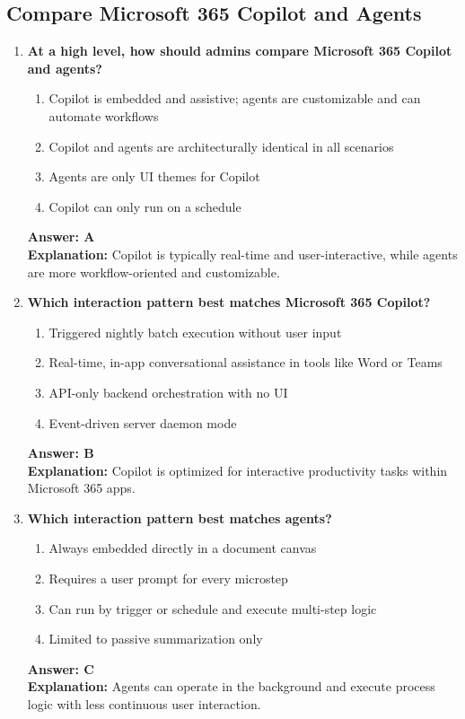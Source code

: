 \documentclass[10pt]{article}
\begin{document}
\subsection{Compare Microsoft 365 Copilot and Agents}
\begin{enumerate}[leftmargin=*]

\item \textbf{At a high level, how should admins compare Microsoft 365 Copilot and agents?}
\begin{enumerate}[label=\Alph*.]
  \item Copilot is embedded and assistive; agents are customizable and can automate workflows
  \item Copilot and agents are architecturally identical in all scenarios
  \item Agents are only UI themes for Copilot
  \item Copilot can only run on a schedule
\end{enumerate}
\textbf{Answer: A}\\
\textbf{Explanation:} Copilot is typically real-time and user-interactive, while agents are more workflow-oriented and customizable.

\item \textbf{Which interaction pattern best matches Microsoft 365 Copilot?}
\begin{enumerate}[label=\Alph*.]
  \item Triggered nightly batch execution without user input
  \item Real-time, in-app conversational assistance in tools like Word or Teams
  \item API-only backend orchestration with no UI
  \item Event-driven server daemon mode
\end{enumerate}
\textbf{Answer: B}\\
\textbf{Explanation:} Copilot is optimized for interactive productivity tasks within Microsoft 365 apps.

\item \textbf{Which interaction pattern best matches agents?}
\begin{enumerate}[label=\Alph*.]
  \item Always embedded directly in a document canvas
  \item Requires a user prompt for every microstep
  \item Can run by trigger or schedule and execute multi-step logic
  \item Limited to passive summarization only
\end{enumerate}
\textbf{Answer: C}\\
\textbf{Explanation:} Agents can operate in the background and execute process logic with less continuous user interaction.


\end{enumerate}
\end{document}

